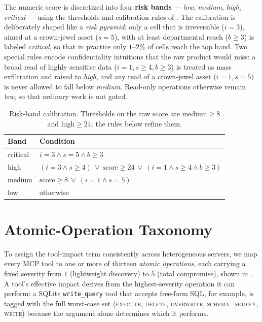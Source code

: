 The numeric score is discretized into four \textbf{risk bands} ---
\textit{low}, \textit{medium}, \textit{high}, \textit{critical} --- using the
thresholds and calibration rules of . The calibration is
deliberately shaped like a \emph{risk pyramid}: only a cell that is irreversible
($i=3$), aimed at a crown-jewel asset ($s=5$), with at least departmental reach
($b \ge 3$) is labeled \textit{critical}, so that in practice only $1$--$2\%$ of
cells reach the top band. Two special rules encode confidentiality intuitions
that the raw product would miss: a broad read of highly sensitive data
($i=1, s\ge4, b\ge3$) is treated as mass exfiltration and raised to
\textit{high}, and any read of a crown-jewel asset ($i=1, s=5$) is never allowed
to fall below \textit{medium}. Read-only operations otherwise remain
\textit{low}, so that ordinary work is not gated.

\begin{table}[H]
    \centering
    \caption{Risk-band calibration. Thresholds on the raw score are
    $\text{medium}\ge 8$ and $\text{high}\ge 24$; the rules below refine them.}
    \label{tab:bands}
    \begin{tabular}{l l}
        \hline
        \textbf{Band} & \textbf{Condition} \\
        \hline
        critical & $i=3 \wedge s=5 \wedge b\ge 3$ \\
        high     & $(i=3 \wedge s\ge 4)\ \vee\ \text{score}\ge 24\ \vee\ (i=1 \wedge s\ge 4 \wedge b\ge 3)$ \\
        medium   & $\text{score}\ge 8\ \vee\ (i=1 \wedge s=5)$ \\
        low      & otherwise \\
        \hline
    \end{tabular}
\end{table}

\section{Atomic-Operation Taxonomy}
\label{sec:framework:atomic}

To assign the tool-impact term consistently across heterogeneous servers, we
map every MCP tool to one or more of thirteen \emph{atomic operations}, each
carrying a fixed severity from $1$ (lightweight discovery) to $5$ (total
compromise), shown in . A tool's effective impact derives from
the highest-severity operation it can perform: a SQLite \texttt{write\_query}
tool that accepts free-form SQL, for example, is tagged with the full
worst-case set (\textsc{execute}, \textsc{delete}, \textsc{overwrite},
\textsc{schema\_modify}, \textsc{write}) because the argument alone determines
which it performs.

